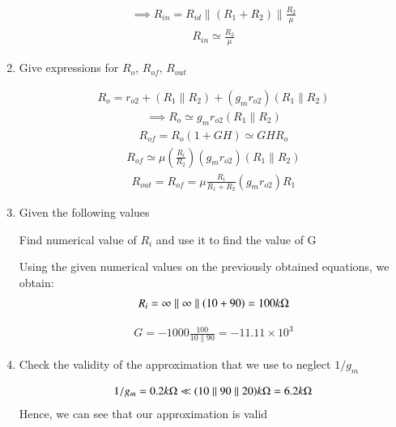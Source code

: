 \begin{enumerate}[label=\thesection.\arabic*.,ref=\thesection.\theenumi]
\begin{align}
    \implies R_{in}=R_{i d}\parallel(R_{1}+R_{2})\parallel \frac{R_{2}}{\mu}
\end{align}
\begin{align}
    R_{in} \simeq \frac{R_{2}}{\mu}
\end{align}

\item 
Give expressions for $R_{o}$, $R_{of}$, $R_{out}$

\solution
\begin{align}
    R_{o}=r_{o 2}+(R_{1} \parallel R_{2})+(g_{m} r_{o 2})(R_{1} \parallel R_{2})
\end{align}
\begin{align}
    \implies R_{o} \simeq g_{m} r_{o 2}\left(R_{1} \parallel R_{2}\right)
\end{align}
\begin{align}
    R_{of}=R_{o}(1+GH) \simeq GH R_{o}
\end{align}
\begin{align}
    R_{of} \simeq \mu (\frac{R_{i}}{R_{2}})(g_{m} r_{o 2})(R_{1} \parallel R_{2})
\end{align}
\begin{align}
    R_{out} = R_{of}=\mu \frac{R_{i}}{R_{1}+R_{2}}(g_{m} r_{o 2}) R_{1}
\end{align}


\item
Given the following values
\begin{table}[!ht]
\centering

\caption{}
\label{table: Input_Table}
\end{table}

Find numerical value of $R_{i}$ and use it to find the value of G

\solution
Using the given numerical values on the previously obtained equations, we obtain:
\begin{align}
    R_{i}=\infty\parallel\infty\parallel(10+90)=100 k\ohm
\end{align}

\begin{align}
    G =-1000 \frac{100}{10 \parallel 90}=-11.11 \times 10^{3}
\end{align}

\item 
Check the validity of the approximation that we use to neglect $1/g_{m}$

\solution
\begin{align}
    1 / g_{m}=0.2 k\ohm \ll (10\parallel90\parallel 20)k\ohm = 6.2k\ohm
\end{align}
Hence, we can see that our approximation is valid


\end{enumerate}
